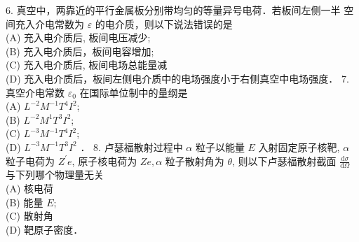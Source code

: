 6. 真空中，两靠近的平行金属板分别带均匀的等量异号电荷．若板间左侧一半 空间充入介电常数为 $\varepsilon$ 的电介质，则以下说法错误的是 \\
(A) 充入电介质后, 板间电压减少;\\
(B) 充入电介质后，板间电容增加;\\
(C) 充入电介质后, 板间电场总能量减\\
(D) 充入电介质后，板间左侧电介质中的电场强度小于右侧真空中电场强度．
7. 真空介电常数 $\varepsilon_{0}$ 在国际单位制中的量纲是\\
(A) $L^{-2} M^{-1} T^{4} I^{2}$;\\
(B) $L^{-2} M^{1} T^{3} I^{2}$;\\
(C) $L^{-3} M^{-1} T^{4} I^{2}$;\\
(D) $L^{-3} M^{-1} T^{3} I^{2}$ ．
8. 卢瑟福散射过程中 $\alpha$ 粒子以能量 $E$ 入射固定原子核靶, $\alpha$ 粒子电荷为 $Z^{\prime} e$, 原子核电荷为 $Z e, \alpha$ 粒子散射角为 $\theta$, 则以下卢瑟福散射截面 $\frac{\mathrm{d} \sigma}{\mathrm{d} \Omega}$ 与下列哪个物理量无关\\
(A) 核电荷\\
(B) 能量 $E$;\\
(C) 散射角\\
(D) 靶原子密度．
